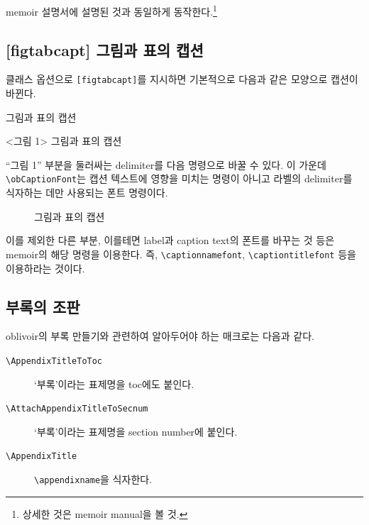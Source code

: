 \documentclass[
	12pt,
	a4paper,
	kosection,
	footnote,
	nobookmarks,
	microtype,
	figtabcapt,
]{oblivoir}
\def\cs#1{\texttt{\textbackslash #1}}
\begin{document}
\footnotesatfoot
\textsf{memoir} 설명서에 설명된 것과 동일하게 동작한다.\footnote{상세한 것은 memoir manual을 볼 것.}

\subsection{[figtabcapt] 그림과 표의 캡션}

클래스 옵션으로 \texttt{[figtabcapt]}를 지시하면 기본적으로 다음과 같은 모양으로 캡션이 바뀐다.

\begin{boxedverbatim}
\caption{그림과 표의 캡션}
\end{boxedverbatim}
\begin{minipage}{\linewidth}
\centering
<그림 1> \quad 그림과 표의 캡션
\end{minipage}

\medskip

``그림 1'' 부분을 둘러싸는 delimiter를 다음 명령으로 바꿀 수 있다. 이 가운데
\verb|\obCaptionFont|는 캡션 텍스트에 영향을 미치는 명령이 아니고 라벨의 delimiter를
식자하는 데만 사용되는 폰트 명령이다.
\begin{boxedverbatim}
\renewcommand*\obCaptionnameOpen{[}
\renewcommand*\obCaptionnameClose{]}
\obCaptionFont{\sffamily\bfseries}
\end{boxedverbatim}
\renewcommand*\obCaptionnameOpen{[}
\renewcommand*\obCaptionnameClose{]}
\obCaptionFont{\sffamily}

\begin{figure}[h]
\caption{그림과 표의 캡션}
\end{figure}

이를 제외한 다른 부분, 이를테면 label과 caption text의 폰트를 바꾸는 것 등은 memoir의
해당 명령을 이용한다. 즉, \verb|\captionnamefont|, \verb|\captiontitlefont| 등을 이용하라는 것이다.

\subsection{부록의 조판}

\textsf{oblivoir}의 부록 만들기와 관련하여 알아두어야 하는 매크로는 다음과 같다.
\begin{description}
\item [\cs{AppendixTitleToToc}] `부록'이라는 표제명을 toc에도 붙인다.
\item [\cs{AttachAppendixTitleToSecnum}] `부록'이라는 표제명을 section number에 붙인다.
\item [\cs{AppendixTitle}] \cs{appendixname}을 식자한다.
\end{description}
\end{document}
